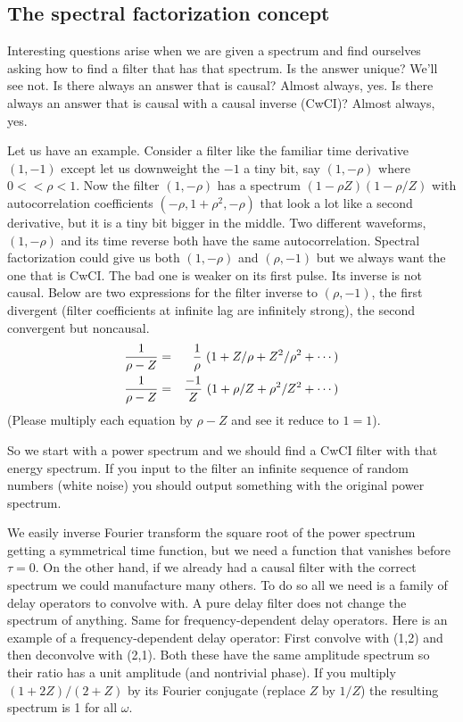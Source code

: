 \subsection{The spectral factorization concept}
Interesting questions arise when we are given a spectrum
and find ourselves asking how to find a filter that has that spectrum.
Is the answer unique?  We'll see not.
Is there always an answer that is causal?
Almost always, yes.
Is there always an answer that is causal with a causal inverse (CwCI)?
Almost always, yes.

\par
Let us have an example.
Consider a filter like the familiar time derivative $(1,-1)$ except
let us downweight the $-1$ a tiny bit, say $(1,-\rho)$ where $0<<\rho<1$.
Now the filter $(1,-\rho)$
has a spectrum $(1-\rho Z)(1-\rho/Z)$ with autocorrelation
coefficients $(-\rho, 1+\rho^2,-\rho)$ that look a lot like a second
derivative, but it is a tiny bit bigger in the middle.
Two different waveforms, $(1,-\rho)$ and its time reverse
both have the same autocorrelation.
Spectral factorization could give us both $(1,-\rho)$ and $(\rho,-1)$
but we always want the one that is CwCI.
The bad one is weaker on its first pulse.
Its inverse is not causal.
Below are two expressions for the filter inverse to $(\rho,-1)$,
the first divergent
(filter coefficients at infinite lag are infinitely strong),
the second convergent but noncausal.
\begin{eqnarray}
{1\over \rho -Z} &=& { 1\over\rho}\ ( 1 +Z/\rho +Z^2/\rho^2+ \cdots)
\\
{1\over \rho -Z} &=& {-1\over Z}\ ( 1 + \rho/Z + \rho^2/Z^2 + \cdots)
\end{eqnarray}
(Please multiply each equation by $\rho -Z$ and see it reduce to $1=1$).

\par
So we start with a power spectrum and we should find
a CwCI filter with that energy spectrum.
If you input to the filter an infinite sequence of random numbers
(white noise)
you should output something with the original power spectrum.

\par
We easily inverse Fourier transform the square root of the power spectrum
getting a symmetrical time function, but
we need a function that vanishes before $\tau=0$.
On the other hand,
if we already had a causal filter with the correct spectrum
we could manufacture many others.
To do so all we need is a family of delay operators to convolve with.
A pure delay filter does not change the spectrum of anything.
Same for frequency-dependent delay operators.
Here is an example of a frequency-dependent delay operator:
First convolve with (1,2) and then deconvolve with (2,1).
Both these have the same amplitude spectrum so their ratio
has a unit amplitude (and nontrivial phase).
If you multiply $(1+2Z)/(2+Z)$ by its Fourier conjugate
(replace $Z$ by $1/Z$) the resulting spectrum is 1 for all $\omega$.

